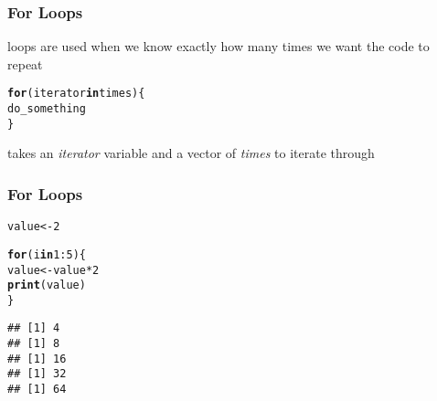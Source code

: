\documentclass[12pt]{beamer}\usepackage[]{graphicx}\usepackage[]{color}
\makeatletter
\newcommand{\hlnum}[1]{\textcolor[rgb]{0.686,0.059,0.569}{#1}}%
\newcommand{\hlopt}[1]{\textcolor[rgb]{0,0,0}{#1}}%
\newcommand{\hlstd}[1]{\textcolor[rgb]{0.345,0.345,0.345}{#1}}%
\newcommand{\hlkwa}[1]{\textcolor[rgb]{0.161,0.373,0.58}{\textbf{#1}}}%
\newcommand{\hlkwb}[1]{\textcolor[rgb]{0.69,0.353,0.396}{#1}}%
\newcommand{\hlkwd}[1]{\textcolor[rgb]{0.737,0.353,0.396}{\textbf{#1}}}%
\newenvironment{kframe}{%
 \def\at@end@of@kframe{}%
 \ifinner\ifhmode%
  \def\at@end@of@kframe{\end{minipage}}%
  \begin{minipage}{\columnwidth}%
 \fi\fi%
 \def\FrameCommand##1{\hskip\@totalleftmargin \hskip-\fboxsep
 \colorbox{shadecolor}{##1}\hskip-\fboxsep
     \hskip-\linewidth \hskip-\@totalleftmargin \hskip\columnwidth}%
 \MakeFramed {\advance\hsize-\width
   \@totalleftmargin\z@ \linewidth\hsize
   \@setminipage}}%
 {\par\unskip\endMakeFramed%
 \at@end@of@kframe}
\newenvironment{knitrout}{}{} %
\makeatother
\begin{document}

\begin{frame}[fragile]
\frametitle{For Loops}

 loops are used when we know exactly how many times we want the code to repeat
\begin{knitrout}\footnotesize
{}\color{fgcolor}\begin{kframe}
\begin{alltt}
\hlkwa{for} \hlstd{(iterator} \hlkwa{in} \hlstd{times) \{}
  \hlstd{do_something}
\hlstd{\}}
\end{alltt}
\end{kframe}
\end{knitrout}

 takes an \textit{iterator} variable and a vector of \textit{times} to iterate through

\end{frame}


\begin{frame}[fragile]
\frametitle{For Loops}

\begin{knitrout}\footnotesize
{}\color{fgcolor}\begin{kframe}
\begin{alltt}
\hlstd{value} \hlkwb{<-} \hlnum{2}

\hlkwa{for} \hlstd{(i} \hlkwa{in} \hlnum{1}\hlopt{:}\hlnum{5}\hlstd{) \{}
  \hlstd{value} \hlkwb{<-} \hlstd{value} \hlopt{*} \hlnum{2}
  \hlkwd{print}\hlstd{(value)}
\hlstd{\}}
\end{alltt}
\begin{verbatim}
## [1] 4
## [1] 8
## [1] 16
## [1] 32
## [1] 64
\end{verbatim}
\end{kframe}
\end{knitrout}

\end{frame}

\end{document}
